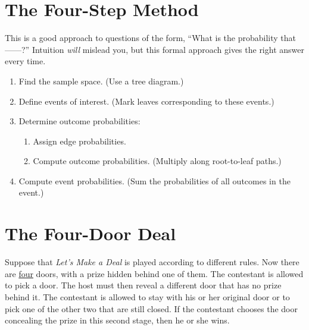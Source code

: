 \documentclass[12pt]{article}
\begin{document}


\section*{The Four-Step Method}

This is a good approach to questions of the form, ``What is the
probability that ------?''  Intuition \textit{will} mislead you, but
this formal approach gives the right answer every time.

\begin{enumerate}
\item Find the sample space.  (Use a tree diagram.)

\item Define events of interest.  (Mark leaves corresponding to these
events.)

\item Determine outcome probabilities:

\begin{enumerate}

\item Assign edge probabilities.

\item Compute outcome probabilities.  (Multiply along root-to-leaf
paths.)

\end{enumerate}

\item Compute event probabilities.  (Sum the probabilities of all
outcomes in the event.)

\end{enumerate}


\newpage


\section{The Four-Door Deal}

Suppose that {\em Let's Make a Deal} is played according to different
rules.  Now there are \underline{four} doors, with a prize hidden
behind one of them.  The contestant is allowed to pick a door.  The
host must then reveal a different door that has no prize behind it.
The contestant is allowed to stay with his or her original door or to
pick one of the other two that are still closed.  If the contestant
chooses the door concealing the prize in this second stage, then he or
she wins.
\end{document}
